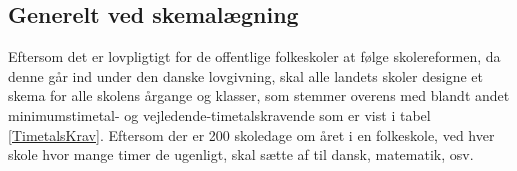 \subsection{Generelt ved skemalægning}
Eftersom det er lovpligtigt for de offentlige folkeskoler at følge skolereformen, da denne går ind under den danske lovgivning, skal alle landets skoler designe et skema for alle skolens årgange og klasser, som stemmer overens med blandt andet minimumstimetal- og vejledende-timetalskravende som er vist i tabel \ref{TimetalsKrav}. Eftersom der er 200 skoledage om året i en folkeskole\cite{elevers_timetal}, ved hver skole hvor mange timer de ugenligt, skal sætte af til dansk, matematik, osv. 





